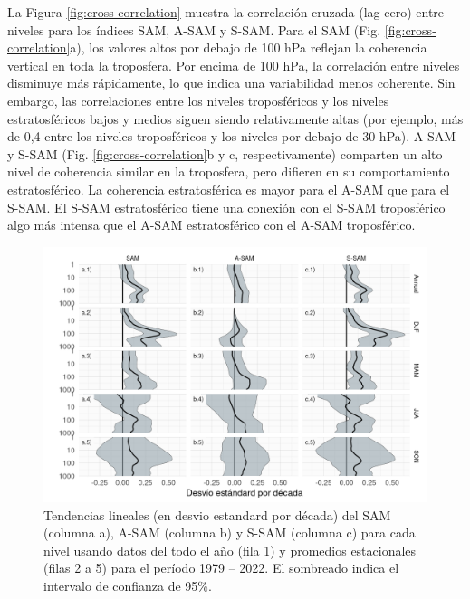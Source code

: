 \documentclass[12pt,oneside]{reedthesis}
\begin{document}
La Figura \ref{fig:cross-correlation} muestra la correlación cruzada (lag cero) entre niveles para los índices SAM, A-SAM y S-SAM.
Para el SAM (Fig. \ref{fig:cross-correlation}a), los valores altos por debajo de 100 hPa reflejan la coherencia vertical en toda la troposfera.
Por encima de 100 hPa, la correlación entre niveles disminuye más rápidamente, lo que indica una variabilidad menos coherente.
Sin embargo, las correlaciones entre los niveles troposféricos y los niveles estratosféricos bajos y medios siguen siendo relativamente altas (por ejemplo, más de 0,4 entre los niveles troposféricos y los niveles por debajo de 30 hPa).
A-SAM y S-SAM (Fig. \ref{fig:cross-correlation}b y c, respectivamente) comparten un alto nivel de coherencia similar en la troposfera, pero difieren en su comportamiento estratosférico.
La coherencia estratosférica es mayor para el A-SAM que para el S-SAM.
El S-SAM estratosférico tiene una conexión con el S-SAM troposférico algo más intensa que el A-SAM estratosférico con el A-SAM troposférico.




\begin{figure}
\includegraphics{figures/30-sam/trends-1} \caption{Tendencias lineales (en desvio estandard por década) del SAM (columna a), A-SAM (columna b) y S-SAM (columna c) para cada nivel usando datos del todo el año (fila 1) y promedios estacionales (filas 2 a 5) para el período 1979 -- 2022.
El sombreado indica el intervalo de confianza de 95\%.}\label{fig:trends}
\end{figure}

\end{document}
